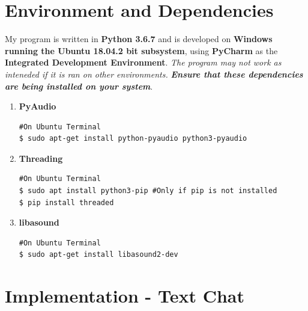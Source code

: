 \documentclass[a4paper,11pt]{article}
\begin{document}
\section{Environment and Dependencies}
My program is written in \textbf{Python 3.6.7} and is developed on \textbf{Windows running the Ubuntu 18.04.2 bit subsystem}, using \textbf{PyCharm} as the \textbf{Integrated Development Environment}. \textit{The program may not work as inteneded if it is ran on other environments.}
\textit{\textbf{Ensure that these dependencies are being installed on your system}}.
\begin{enumerate}
  \item \textbf{PyAudio}
\begin{mdframed}[backgroundcolor=light-gray, roundcorner=30pt,leftmargin=1, rightmargin=1, innerleftmargin=5, innertopmargin=-3,innerbottommargin=5, outerlinewidth=1, linecolor=light-gray]
\begin{lstlisting}
#On Ubuntu Terminal
$ sudo apt-get install python-pyaudio python3-pyaudio
\end{lstlisting}
\end{mdframed}
  \item \textbf{Threading}
\begin{mdframed}[backgroundcolor=light-gray, roundcorner=30pt,leftmargin=1, rightmargin=1, innerleftmargin=5, innertopmargin=-3,innerbottommargin=5, outerlinewidth=1, linecolor=light-gray]
\begin{lstlisting}
#On Ubuntu Terminal
$ sudo apt install python3-pip #Only if pip is not installed
$ pip install threaded
\end{lstlisting}
\end{mdframed}
  \item \textbf{libasound}
\begin{mdframed}[backgroundcolor=light-gray, roundcorner=30pt,leftmargin=1, rightmargin=1, innerleftmargin=5, innertopmargin=-3,innerbottommargin=5, outerlinewidth=1, linecolor=light-gray]
\begin{lstlisting}
#On Ubuntu Terminal
$ sudo apt-get install libasound2-dev
\end{lstlisting}
\end{mdframed}
\end{enumerate}

\section{Implementation - Text Chat}
\end{document}
